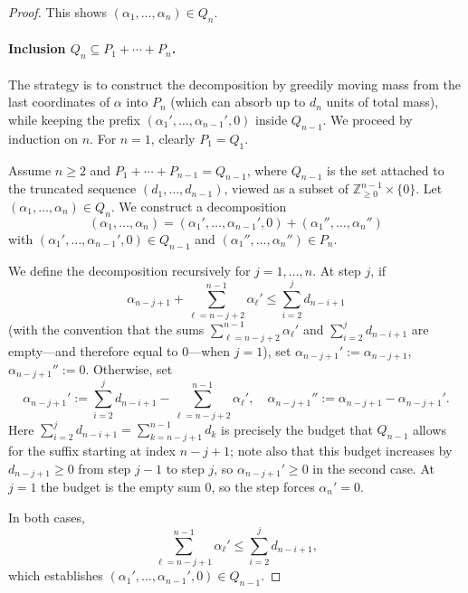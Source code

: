 \begin{proof}
	This shows $(\alpha_1, \ldots, \alpha_n) \in Q_n$.
	
	\paragraph{Inclusion $Q_n \subseteq P_1 + \cdots + P_n$.}
	The strategy is to construct the decomposition by greedily moving mass from the last coordinates of $\alpha$ into $P_n$ (which can absorb up to $d_n$ units of total mass), while keeping the prefix $(\alpha_1',\ldots,\alpha_{n-1}',0)$ inside $Q_{n-1}$. We proceed by induction on $n$. For $n = 1$, clearly $P_1 = Q_1$.
	
	Assume $n \geq 2$ and $P_1 + \cdots + P_{n-1} = Q_{n-1}$, where $Q_{n-1}$ is the set attached to the truncated sequence $(d_1,\ldots,d_{n-1})$, viewed as a subset of $\mathbb{Z}_{\geq 0}^{n-1} \times \{0\}$.
	Let $(\alpha_1, \ldots, \alpha_n) \in Q_n$. We construct a decomposition
	\begin{equation*}
		(\alpha_1, \ldots, \alpha_n) = (\alpha_1', \ldots, \alpha_{n-1}', 0) + (\alpha_1'', \ldots, \alpha_n'')
	\end{equation*}
	with $(\alpha_1', \ldots, \alpha_{n-1}', 0) \in Q_{n-1}$ and $(\alpha_1'', \ldots, \alpha_n'') \in P_n$.
	
	We define the decomposition recursively for $j = 1, \ldots, n$. At step $j$, if
	\begin{equation*}
		\alpha_{n-j+1} + \sum_{\ell=n-j+2}^{n-1} \alpha_\ell' \leq \sum_{i=2}^{j} d_{n-i+1}
	\end{equation*}
	(with the convention that the sums $\sum_{\ell=n-j+2}^{n-1}\alpha_\ell'$ and $\sum_{i=2}^{j}d_{n-i+1}$ are empty---and therefore equal to $0$---when $j=1$), set
	\(\alpha_{n-j+1}' := \alpha_{n-j+1}\), 
    \(\alpha_{n-j+1}'' := 0\).
	Otherwise, set
	\begin{equation*}
		\alpha_{n-j+1}' := \sum_{i=2}^{j} d_{n-i+1} - \sum_{\ell=n-j+2}^{n-1} \alpha_\ell', \quad 
		\alpha_{n-j+1}'' := \alpha_{n-j+1} - \alpha_{n-j+1}'.
	\end{equation*}
	Here $\sum_{i=2}^{j} d_{n-i+1}=\sum_{k=n-j+1}^{n-1} d_k$ is precisely the budget that $Q_{n-1}$ allows for the suffix starting at index $n-j+1$; note also that this budget increases by $d_{n-j+1}\ge 0$ from step $j-1$ to step $j$, so $\alpha_{n-j+1}'\ge 0$ in the second case. At $j=1$ the budget is the empty sum $0$, so the step forces $\alpha_n'=0$.
	
	In both cases,
	\begin{equation*}
		\sum_{\ell=n-j+1}^{n-1} \alpha_\ell' \leq \sum_{i=2}^{j} d_{n-i+1},
	\end{equation*}
	which establishes $(\alpha_1', \ldots, \alpha_{n-1}', 0) \in Q_{n-1}$.
	

\end{proof}
